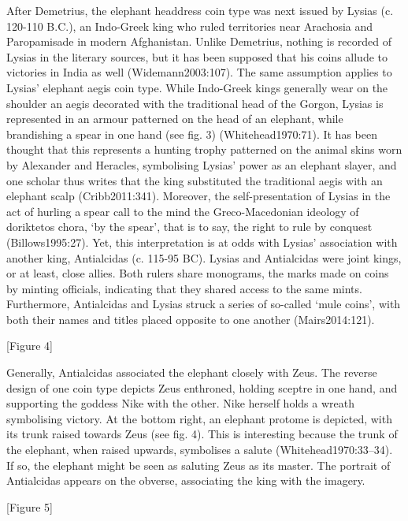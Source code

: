 \documentclass{ijsra}
\begin{document}
After Demetrius, the elephant headdress coin type was next issued by Lysias (c. 120-110 B.C.), an Indo-Greek king who ruled
territories near Arachosia and Paropamisade in modern Afghanistan. 
Unlike Demetrius, nothing is recorded of Lysias in the literary sources, but it has been supposed that his coins allude to
victories in India as well (Widemann2003:107).
The same assumption applies to Lysias’ elephant aegis coin type. 
While Indo-Greek kings generally wear on the shoulder an aegis decorated with the traditional head of the Gorgon, Lysias is
represented in an armour patterned on the head of an elephant, while brandishing a spear in one hand (see fig. 3) (Whitehead1970:71). 
It has been thought that this represents a hunting trophy patterned on the animal skins worn by Alexander and Heracles,
symbolising Lysias’ power as an elephant slayer, and one scholar thus writes that the king substituted the traditional aegis with
an elephant scalp (Cribb2011:341). 
Moreover, the self-presentation of Lysias in the act of hurling a spear call to the mind the Greco-Macedonian ideology of
doriktetos chora, ‘by the spear’, that is to say, the right to rule by conquest (Billows1995:27). 
Yet, this interpretation is at odds with Lysias’ association with another king, Antialcidas (c. 115-95 BC). 
Lysias and Antialcidas were joint kings, or at least, close allies. 
Both rulers share monograms, the marks made on coins by minting officials, indicating that they shared access to the same mints. 
Furthermore, Antialcidas and Lysias struck a series of so-called ‘mule coins’, with both their names and titles placed opposite to
one another (Mairs2014:121).

[Figure 4]

Generally, Antialcidas associated the elephant closely with Zeus. The reverse design of one coin type depicts Zeus enthroned,
holding sceptre in one hand, and supporting the goddess Nike with the other.
Nike herself holds a wreath symbolising victory.
At the bottom right, an elephant protome is depicted, with its trunk raised towards Zeus (see fig. 4).
This is interesting because the trunk of the elephant, when raised upwards, symbolises a salute (Whitehead1970:33–34).
If so, the elephant might be seen as saluting Zeus as its master.
The portrait of Antialcidas appears on the obverse, associating the king with the imagery. 

[Figure 5]
\end{document}
